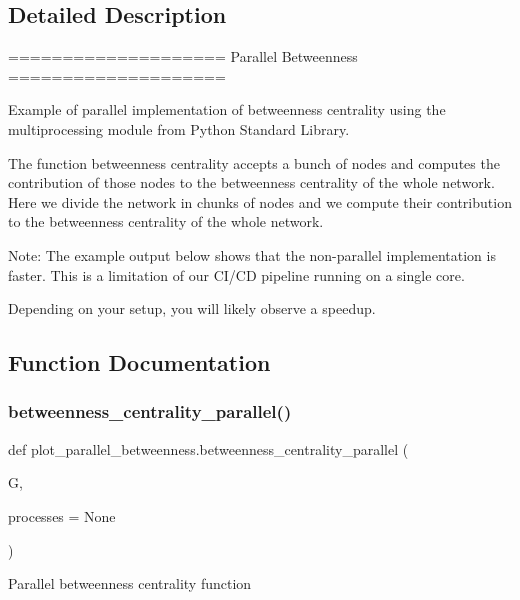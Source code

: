 \subsection{Detailed Description}
\begin{DoxyVerb}====================
Parallel Betweenness
====================

Example of parallel implementation of betweenness centrality using the
multiprocessing module from Python Standard Library.

The function betweenness centrality accepts a bunch of nodes and computes
the contribution of those nodes to the betweenness centrality of the whole
network. Here we divide the network in chunks of nodes and we compute their
contribution to the betweenness centrality of the whole network.

Note: The example output below shows that the non-parallel implementation is
faster. This is a limitation of our CI/CD pipeline running on a single core.

Depending on your setup, you will likely observe a speedup.
\end{DoxyVerb}
 

\subsection{Function Documentation}
\mbox{\label{namespaceplot__parallel__betweenness_a12f186c06f1573546f40373301f884d4}} 
\subsubsection{\texorpdfstring{betweenness\+\_\+centrality\+\_\+parallel()}{betweenness\_centrality\_parallel()}}
{\footnotesize\ttfamily def plot\+\_\+parallel\+\_\+betweenness.\+betweenness\+\_\+centrality\+\_\+parallel (\begin{DoxyParamCaption}\item[{}]{G,  }\item[{}]{processes = {\ttfamily None} }\end{DoxyParamCaption})}

\begin{DoxyVerb}Parallel betweenness centrality  function\end{DoxyVerb}
 \mbox{\label{namespaceplot__parallel__betweenness_a12a74e041def2d649403c69d0fe0345b}} 
